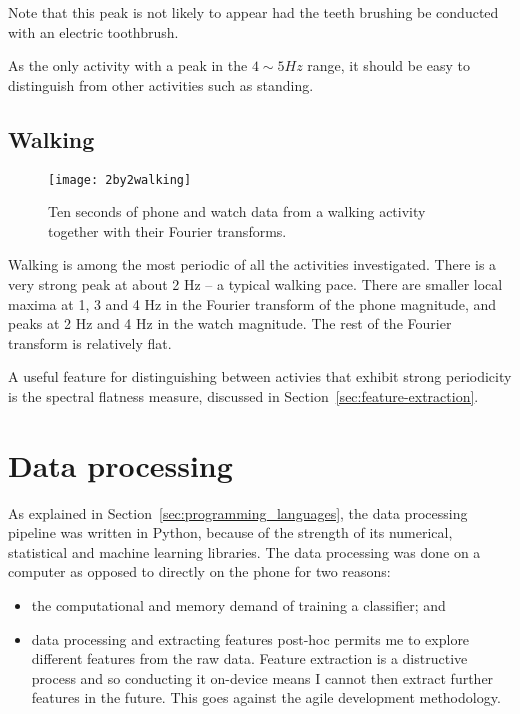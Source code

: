       Note that this peak is not likely to appear had the teeth brushing be conducted with an electric toothbrush.
      
      As the only activity with a peak in the $4 \sim 5 \si{Hz}$ range, it should be easy to distinguish from other activities such as standing.
    \pagebreak[4]
    \subsection{Walking}
      \begin{figure}[!th]
        \centering
        \texttt{[image: 2by2walking]}
        \caption[Walking sample]{Ten seconds of phone and watch data from a walking activity together with their Fourier transforms.}
        \label{fig:2by2walking}
      \end{figure}
      
      Walking is among the most periodic of all the activities investigated. There is a very strong peak at about 2 Hz -- a typical walking pace. There are smaller local maxima at 1, 3 and 4 Hz in the Fourier transform of the phone magnitude, and peaks at 2 Hz and 4 Hz in the watch magnitude. The rest of the Fourier transform is relatively flat.
      
      A useful feature for distinguishing between activies that exhibit strong periodicity is the spectral flatness measure, discussed in Section~\ref{sec:feature-extraction}.

  \section{Data processing}
    \label{sec:data-processing}
    As explained in Section~\ref{sec:programming_languages}, the data processing pipeline was written in Python, because of the strength of its numerical, statistical and machine learning libraries. The data processing was done on a computer as opposed to directly on the phone for two reasons:
    \begin{itemize}
      \item the computational and memory demand of training a classifier; and
      \item data processing and extracting features post-hoc permits me to explore different features from the raw data. Feature extraction is a distructive process and so conducting it on-device means I cannot then extract further features in the future. This goes against the agile development methodology.
    \end{itemize}
    
